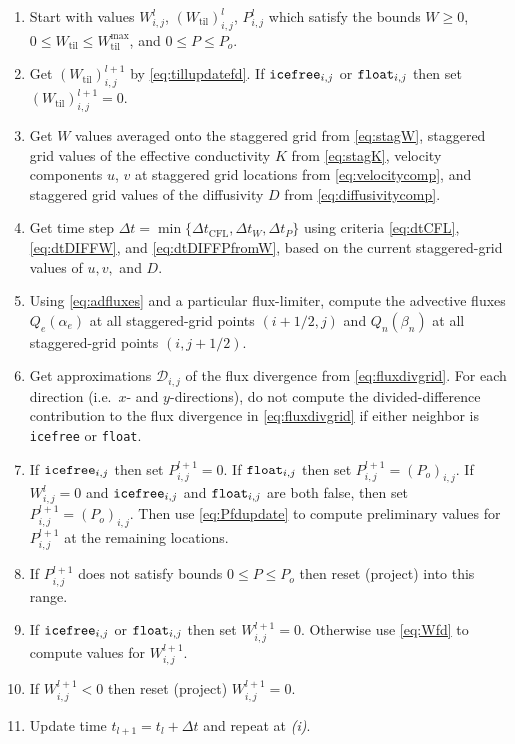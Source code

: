 \documentclass[gmd]{copernicus}   %
\newcommand{\text}{\textrm}
\newcommand{\Wtil}{W_{\text{til}}}
\newcommand{\Wtilmax}{W_{\text{til}}^{\text{max}}}
\newcommand{\Wlij}{W^l_{i,j}}
\newcommand{\Plij}{P^l_{i,j}}
\begin{document}
\renewcommand{\labelenumi}{\emph{(\roman{enumi})}}
\begin{enumerate}
\item Start with values $\Wlij$, $(\Wtil)_{i,j}^l$, $\Plij$ which satisfy the bounds $W\ge 0$, $0\le \Wtil \le \Wtilmax$, and $0 \le P \le P_o$.
\item Get $(\Wtil)_{i,j}^{l+1}$ by \eqref{eq:tillupdatefd}.  If $\text{\texttt{icefree}}_{i,j}$ or $\text{\texttt{float}}_{i,j}$ then set $(\Wtil)_{i,j}^{l+1}=0$.
\item Get $W$ values averaged onto the staggered grid from \eqref{eq:stagW}, staggered grid values of the effective conductivity $K$ from \eqref{eq:stagK}, velocity components $u$, $v$ at staggered grid locations from \eqref{eq:velocitycomp}, and staggered grid values of the diffusivity $D$ from \eqref{eq:diffusivitycomp}.
\item Get time step $\Delta t = \min\{\Delta t_{\text{CFL}}, \Delta t_W, \Delta t_P\}$ using criteria \eqref{eq:dtCFL}, \eqref{eq:dtDIFFW}, and \eqref{eq:dtDIFFPfromW}, based on the current staggered-grid values of $u,v,$ and $D$.
\item Using \eqref{eq:adfluxes} and a particular flux-limiter, compute the advective fluxes $Q_e(\alpha_e)$ at all staggered-grid points $(i+1/2,j)$ and $Q_n(\beta_n)$ at all staggered-grid points $(i,j+1/2)$.
\item Get approximations $\mathcal{D}_{i,j}$ of the flux divergence from \eqref{eq:fluxdivgrid}.  For each direction (i.e.~$x$- and $y$-directions), do not compute the divided-difference contribution to the flux divergence in \eqref{eq:fluxdivgrid} if either neighbor is \texttt{icefree} or \texttt{float}.
\item If $\text{\texttt{icefree}}_{i,j}$ then set $P_{i,j}^{l+1}=0$.  If $\text{\texttt{float}}_{i,j}$ then set $P_{i,j}^{l+1} = (P_o)_{i,j}$.  If $\Wlij=0$ and $\text{\texttt{icefree}}_{i,j}$ and $\text{\texttt{float}}_{i,j}$ are both false, then set $P_{i,j}^{l+1} = (P_o)_{i,j}$.  Then use \eqref{eq:Pfdupdate} to compute preliminary values for $P_{i,j}^{l+1}$ at the remaining locations.
\item If $P_{i,j}^{l+1}$ does not satisfy bounds $0 \le P \le P_o$ then reset (project) into this range.
\item If $\text{\texttt{icefree}}_{i,j}$ or $\text{\texttt{float}}_{i,j}$ then set $W_{i,j}^{l+1}=0$.  Otherwise use \eqref{eq:Wfd} to compute values for $W_{i,j}^{l+1}$.
\item If $W_{i,j}^{l+1}<0$ then reset (project) $W_{i,j}^{l+1}=0$.
\item Update time $t_{l+1}=t_l+\Delta t$ and repeat at \emph{(i)}.
\end{enumerate}
\end{document}

